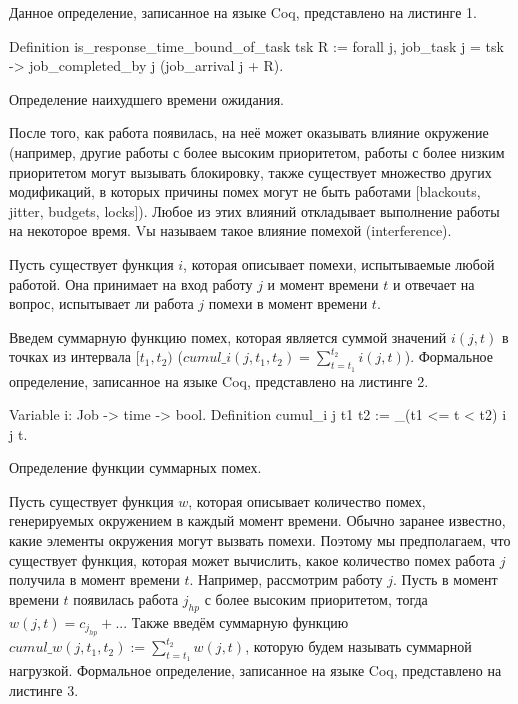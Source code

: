 Данное определение, записанное на языке Coq, представлено на листинге 1.

\begin{listing}
\begin{pyglist}[numbers=none,numbersep=5pt, fontsize=\small]
  Definition is_response_time_bound_of_task tsk R :=
    forall j,
      job_task j = tsk ->
      job_completed_by j (job_arrival j + R).
\end{pyglist}
\caption{Определение наихудшего времени ожидания.}
\label{lst:def:rtb}
\end{listing}


После того, как работа появилась, на неё может оказывать влияние окружение (например,
  другие работы с более высоким приоритетом, работы с более низким приоритетом могут
  вызывать блокировку, также существует множество других модификаций, в
  которых причины помех могут не быть работами [blackouts, jitter, budgets, locks]).
  Любое из этих влияний откладывает выполнение работы на некоторое время.
  Vы называем такое влияние помехой (interference).

Пусть существует функция $i$, которая описывает помехи, испытываемые любой работой. Она
  принимает на вход работу $j$ и момент времени $t$ и отвечает
  на вопрос, испытывает ли работа $j$ помехи в момент времени $t$.

Введем суммарную функцию помех, которая является суммой значений $i(j,t)$
  в точках из интервала $[t_1, t_2)$ ($cumul\_i(j,t_1,t_2) = \sum_{t = t_1}^{t_2} i(j,t)$).
  Формальное определение, записанное на языке Coq, представлено на листинге 2.


\begin{listing}
\begin{pyglist}[numbers=none,numbersep=5pt, fontsize=\small]
  Variable i: Job -> time -> bool.
  Definition cumul_i j t1 t2 :=
    \sum_(t1 <= t < t2) i j t.
\end{pyglist}
\caption{Определение функции суммарных помех.}
\label{lst:theorem2}
\end{listing}

Пусть существует функция $w$, которая описывает количество помех,
  генерируемых окружением в каждый момент времени. Обычно заранее известно, какие
  элементы окружения могут вызвать помехи. Поэтому мы предполагаем, что существует
  функция, которая может вычислить, какое количество помех работа $j$ получила в
  момент времени $t$. Например, рассмотрим работу $j$. Пусть в момент времени $t$
  появилась работа $j_{hp}$ с более высоким приоритетом, тогда $w(j,t) = c_{j_{hp}} + ..$.
  Также введём суммарную функцию $cumul\_w(j,t_1,t_2) := \sum_{t = t_1}^{t_2} w(j,t)$,
  которую будем называть суммарной нагрузкой.
  Формальное определение, записанное на языке Coq, представлено на листинге 3.

